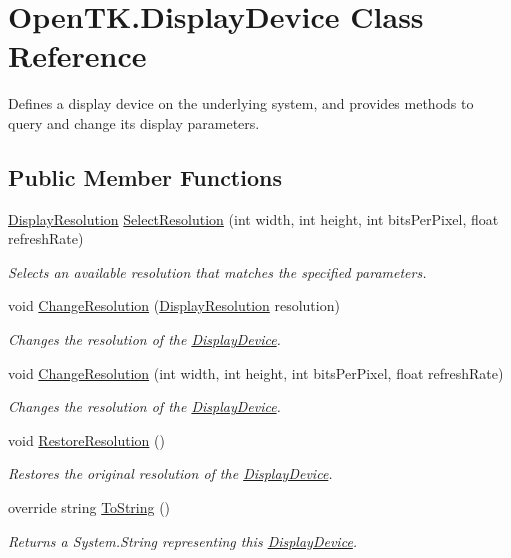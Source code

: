 \hypertarget{class_open_t_k_1_1_display_device}{\section{Open\-T\-K.\-Display\-Device Class Reference}
\label{class_open_t_k_1_1_display_device}
}


Defines a display device on the underlying system, and provides methods to query and change its display parameters.  


\subsection*{Public Member Functions}
\begin{DoxyCompactItemize}
\item 
\hyperlink{class_open_t_k_1_1_display_resolution}{Display\-Resolution} \hyperlink{class_open_t_k_1_1_display_device_ad2882c9f3dc2236e2ada0ef2c4df11d2}{Select\-Resolution} (int width, int height, int bits\-Per\-Pixel, float refresh\-Rate)
\begin{DoxyCompactList}\small\item\em Selects an available resolution that matches the specified parameters. \end{DoxyCompactList}\item 
void \hyperlink{class_open_t_k_1_1_display_device_ac993a7370baae2f590e71abe57c5b3b8}{Change\-Resolution} (\hyperlink{class_open_t_k_1_1_display_resolution}{Display\-Resolution} resolution)
\begin{DoxyCompactList}\small\item\em Changes the resolution of the \hyperlink{class_open_t_k_1_1_display_device}{Display\-Device}.\end{DoxyCompactList}\item 
void \hyperlink{class_open_t_k_1_1_display_device_a0accb55553a4d11804954b9675007404}{Change\-Resolution} (int width, int height, int bits\-Per\-Pixel, float refresh\-Rate)
\begin{DoxyCompactList}\small\item\em Changes the resolution of the \hyperlink{class_open_t_k_1_1_display_device}{Display\-Device}.\end{DoxyCompactList}\item 
void \hyperlink{class_open_t_k_1_1_display_device_afec8cf22992c7c17ce1c6921f651378f}{Restore\-Resolution} ()
\begin{DoxyCompactList}\small\item\em Restores the original resolution of the \hyperlink{class_open_t_k_1_1_display_device}{Display\-Device}.\end{DoxyCompactList}\item 
override string \hyperlink{class_open_t_k_1_1_display_device_a96b1b8d8248b8e524e45eba59b2ab00f}{To\-String} ()
\begin{DoxyCompactList}\small\item\em Returns a System.\-String representing this \hyperlink{class_open_t_k_1_1_display_device}{Display\-Device}. \end{DoxyCompactList}\end{DoxyCompactItemize}
